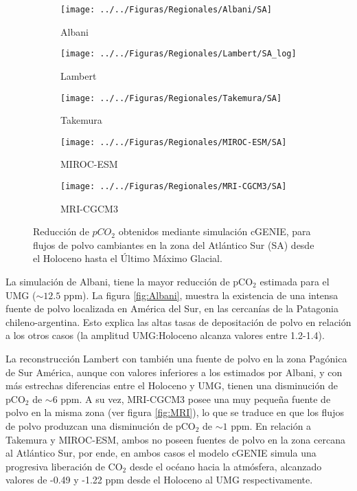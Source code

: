  \begin{figure}[H]
        \begin{subfigure}[b]{0.5\textwidth}
                \texttt{[image: ../../Figuras/Regionales/Albani/SA]}
                \caption{Albani}
                \label{fig:L_R_SA}
        \end{subfigure}%
        \begin{subfigure}[b]{0.5\textwidth}
                \texttt{[image: ../../Figuras/Regionales/Lambert/SA\_log]}
                \caption{Lambert}
                \label{fig:A_R_SA}
        \end{subfigure}%
        
        \begin{subfigure}[b]{0.5\textwidth}
                \texttt{[image: ../../Figuras/Regionales/Takemura/SA]}
                \caption{Takemura}
                \label{fig:T_R_SA}
        \end{subfigure}%
        \begin{subfigure}[b]{0.5\textwidth}
                \texttt{[image: ../../Figuras/Regionales/MIROC-ESM/SA]}
                \caption{MIROC-ESM}
                \label{fig:MI_R_SA}
        \end{subfigure}
        
        \begin{subfigure}[b]{0.5\textwidth}
                \texttt{[image: ../../Figuras/Regionales/MRI-CGCM3/SA]}
                \caption{MRI-CGCM3}
                \label{fig:MR_R_SA}
        \end{subfigure}
        \caption[Series de reducci\'on de $pCO_2$ de flujos regionales de polvo (SA)]{Reducci\'on de $pCO_2$ obtenidos mediante simulaci\'on cGENIE, para flujos de polvo cambiantes en la zona del Atlántico Sur (SA) desde el Holoceno hasta el \'Ultimo M\'aximo Glacial.}\label{fig:SA}
\end{figure}

La simulación de Albani, tiene la mayor reducción de pCO$_2$ estimada para el UMG ($\sim 12.5$ ppm). La figura \ref{fig:Albani}, muestra la existencia de una intensa fuente de polvo localizada en América del Sur, en las cercanías de la Patagonia chileno-argentina. Esto explica las altas tasas de depositación de polvo en relación a los otros casos (la amplitud UMG:Holoceno alcanza valores entre 1.2-1.4). 

La reconstrucción Lambert con también una fuente de polvo en la zona Pagónica de Sur América, aunque con valores inferiores a los estimados por Albani, y con más estrechas diferencias entre el Holoceno y UMG, tienen una disminución de pCO$_2$ de $\sim 6$ ppm. A su vez, MRI-CGCM3 posee una muy pequeña fuente de polvo en la misma zona (ver figura \ref{fig:MRI}), lo que se traduce en que los flujos de polvo produzcan una disminución de pCO$_2$ de $\sim 1$ ppm. En relación a Takemura y MIROC-ESM, ambos no poseen fuentes de polvo en la zona cercana al Atlántico Sur, por ende, en ambos casos el modelo cGENIE simula una progresiva liberación de CO$_2$ desde el océano hacia la atmósfera, alcanzado valores de -0.49 y -1.22 ppm desde el Holoceno al UMG respectivamente. 


